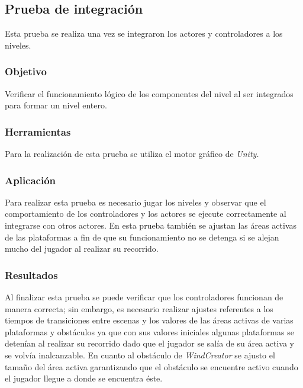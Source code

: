 \subsection{Prueba de integración}
Esta prueba se realiza una vez se integraron los actores y controladores a los
niveles.

\subsubsection{Objetivo}
Verificar el funcionamiento lógico de los componentes del nivel al ser integrados
para formar un nivel entero.

\subsubsection{Herramientas}
Para la realización de esta prueba se utiliza el motor gráfico de \textit{Unity.}

\subsubsection{Aplicación}
Para realizar esta prueba es necesario jugar los niveles y observar que el
comportamiento de los controladores y los actores se ejecute correctamente al
integrarse con otros actores. En esta prueba también se ajustan las áreas activas de las
plataformas a fin de que su funcionamiento no se detenga si se alejan mucho del
jugador al realizar su recorrido.
                
\subsubsection{Resultados}
Al finalizar esta prueba se puede verificar que los controladores funcionan de
manera correcta; sin embargo, es necesario realizar ajustes referentes a los
tiempos de transiciones entre escenas y los valores de las áreas activas de
varias plataformas y obstáculos ya que con sus valores iniciales algunas
plataformas se detenían al realizar su recorrido dado que el jugador se salía
de su área activa y se volvía inalcanzable. En cuanto al obstáculo de
\textit{WindCreator} se ajusto el tamaño del área activa garantizando que el
obstáculo se encuentre activo cuando el jugador llegue a donde se encuentra éste. 


